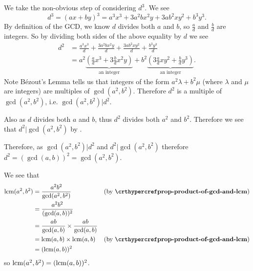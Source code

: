 \begin{questions}
\begin{partquestions}{\roman*}
        We take the non-obvious step of considering $d^3$. We see
        \[
            d^3 = (ax+by)^3 = a^3x^3 + 3a^2bx^2y + 3ab^2xy^2 + b^3y^3.
        \]
        By definition of the GCD, we know $d$ divides both $a$ and $b$, so $\frac ad$ and $\frac bd$ are integers. So by dividing both sides of the above equality by $d$ we see
        \begin{align*}
            d^2 &= \frac{a^3x^3}{d} + \frac{3a^2bx^2y}{d} + \frac{3ab^2xy^2}{d} + \frac{b^3y^3}{d}\\
            &= a^2\underbrace{\left(\frac{a}{d}x^3 + 3\frac{b}{d}x^2y\right)}_{\text{an integer}} + b^2\underbrace{\left(3\frac{a}{d}xy^2 + \frac{b}{d}y^3\right)}_{\text{an integer}}.
        \end{align*}
        Note B\'{e}zout's Lemma tells us that integers of the form $a^2\lambda + b^2\mu$ (where $\lambda$ and $\mu$ are integers) are multiples of $\gcd(a^2, b^2)$. Therefore $d^2$ is a multiple of $\gcd(a^2, b^2)$, i.e. $\gcd(a^2, b^2) \vert d^2$.

        Also as $d$ divides both $a$ and $b$, thus $d^2$ divides both $a^2$ and $b^2$. Therefore we see that $d^2 \vert \gcd(a^2, b^2)$ by .

        Therefore, as $\gcd(a^2, b^2) \vert d^2$ and $d^2 \vert \gcd(a^2, b^2)$ therefore $d^2 = (\gcd(a,b))^2 = \gcd(a^2, b^2)$.

        \item We see that
        \begin{align*}
            \lcm(a^2,b^2) &= \frac{a^2b^2}{\gcd(a^2,b^2)} & (\text{by } \myref{prop-product-of-gcd-and-lcm})\\
            &= \frac{a^2b^2}{(\gcd(a,b))^2}\\
            &= \frac{ab}{\gcd(a,b)} \times \frac{ab}{\gcd(a,b)}\\
            &= \lcm(a,b) \times \lcm(a,b) & (\text{by } \myref{prop-product-of-gcd-and-lcm})\\
            &= (\lcm(a,b))^2
        \end{align*}
        so $\mathrm{lcm}(a^2,b^2) = (\mathrm{lcm}(a,b))^2$.
    \end{partquestions}
\end{questions}
